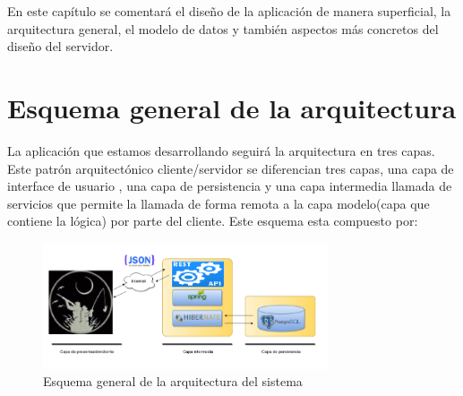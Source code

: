 

En este capítulo se comentará el diseño de la aplicación de manera superficial, la arquitectura general, el modelo de datos y también aspectos más concretos del diseño del servidor.


\section{Esquema general de la arquitectura}

La aplicación que estamos desarrollando seguirá la arquitectura
en tres capas. Este patrón arquitectónico cliente/servidor se diferencian tres
capas, una capa de interface de usuario , una capa de persistencia
y una capa intermedia llamada de servicios que permite la llamada de forma remota a la capa modelo(capa que contiene la lógica) por parte del cliente. Este esquema esta compuesto por:




\begin{figure}[H]
		\centering
		\includegraphics[width=0.75\textwidth] {arquitectura.png}
		\caption{Esquema general de la arquitectura del sistema }
	\end{figure}


